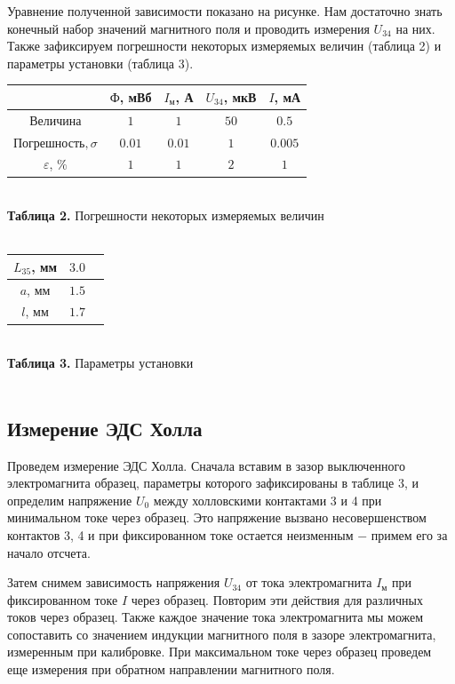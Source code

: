 \documentclass[a4paper,12pt]{article} %
\begin{document}
\hfill \break Уравнение полученной зависимости показано на рисунке. Нам достаточно знать конечный набор значений магнитного поля и проводить измерения $U_{34}$ на них. Также зафиксируем погрешности некоторых измеряемых величин (таблица 2) и параметры установки (таблица 3).

\begin{center}
\begin{tabular}{|c|c|c|c|c|}\hline
&$\text{Ф}$, мВб&$I_\text{м}$, А&$U_{34}$, мкВ&$I$, мА\\\hline
$\text{Величина}$&$1$&$1$&$50$&$0.5$\\\hline
$\text{Погрешность}, \sigma$&$0.01$&$0.01$&$1$&$0.005$\\\hline
$\varepsilon$, $\%$&$1$&$1$&$2$&$1$\\\hline
\end{tabular}\\
\hfill \break \textbf {Таблица 2.} Погрешности некоторых измеряемых величин\\~\\
\end{center}

\hfill \break

\begin{center}
\begin{tabular}{|c|c|c|}\hline
$L_{35}$, мм&$3.0$\\\hline
$a$, мм&$1.5$\\\hline
$l$, мм&$1.7$\\\hline
\end{tabular}\\
\hfill \break \textbf {Таблица 3.} Параметры установки\\~\\
\end{center}

\subsection{Измерение ЭДС Холла}
\hfill \break Проведем измерение ЭДС Холла. Сначала вставим в зазор выключенного электромагнита образец, параметры которого зафиксированы в таблице 3, и определим напряжение $U_{0}$ между холловскими контактами 3 и 4 при минимальном токе через образец. Это напряжение вызвано несовершенством контактов 3, 4 и при фиксированном токе остается неизменным $-$ примем его за начало отсчета.  

\hfill \break Затем снимем зависимость напряжения $U_{34}$ от тока электромагнита $I_\text{м}$ при фиксированном токе $I$ через образец. Повторим эти действия для различных токов через образец. Также каждое значение тока электромагнита мы можем сопоставить со значением индукции магнитного поля в зазоре электромагнита, измеренным при калибровке. При максимальном токе через образец проведем еще измерения при обратном направлении магнитного поля. 
\end{document}

